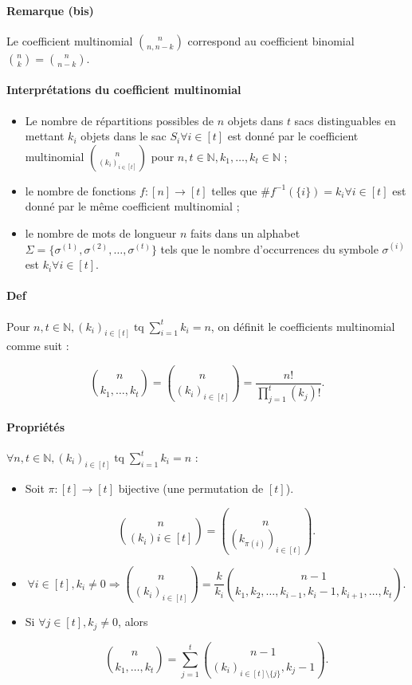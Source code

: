 \documentclass{article}
\DeclareMathOperator{\tq}{\text{ tq }}
\begin{document}
			\paragraph{Remarque (bis)} Le coefficient multinomial $\binom n{n, n-k}$ correspond au coefficient binomial $\binom nk = \binom n{n-k}$.

			\paragraph{Interprétations du coefficient multinomial}

			\begin{itemize}
				\item Le nombre de répartitions possibles de $n$ objets dans $t$ sacs distinguables en mettant $k_i$ objets dans le sac $S_i \forall i \in [t]$ est donné
				par le coefficient multinomial $\binom n{(k_i)_{i\in[t]}}$ pour $n, t \in \mathbb N, k_1, \ldots, k_t \in \mathbb N$ ;
				\item le nombre de fonctions $f : [n] \to [t]$ telles que $\#f^{-1}(\{i\}) = k_i \forall i \in [t]$ est donné par le même coefficient multinomial ;
				\item le nombre de mots de longueur $n$ faits dans un alphabet $\Sigma = \{\sigma^{(1)}, \sigma^{(2)}, \ldots, \sigma^{(t)}\}$ tels que
				le nombre d'occurrences du symbole $\sigma^{(i)}$ est $k_i \forall i \in [t]$.
			\end{itemize}

			\paragraph{Def} Pour $n, t \in \mathbb N, (k_i)_{i\in[t]} \tq \sum_{i=1}^tk_i=n$, on définit le coefficients multinomial comme suit :

			\[\binom {n}{k_1, \ldots, k_t} = \binom {n}{(k_i)_{i\in[t]}} = \frac {n!}{\prod_{j=1}^t(k_j)!}.\]

			\paragraph{Propriétés} $\forall n, t \in \mathbb N, (k_i)_{i\in[t]} \tq \sum_{i=1}^tk_i=n$ :

			\begin{itemize}
				\item Soit $\pi : [t] \to [t]$ bijective (une permutation de $[t]$).

				\[\binom {n}{(k_i){i\in[t]}} = \binom {n}{(k_{\pi(i)})_{i\in[t]}}.\]

				\item

				\[\forall i \in [t], k_i \neq 0 \Rightarrow \binom {n}{(k_i)_{i\in[t]}} = \frac k{k_i} \binom {n-1}{k_1, k_2, \ldots, k_{i-1}, k_i-1, k_{i+1}, \ldots, k_t}.\]

				\item Si $\forall j \in [t], k_j \neq 0$, alors

				\[\binom n{k_1, \ldots, k_t} = \sum_{j=1}^t\binom{n-1}{(k_i)_{i\in[t] \setminus \{j\}}, k_j-1}.\]
			\end{itemize}
\end{document}
